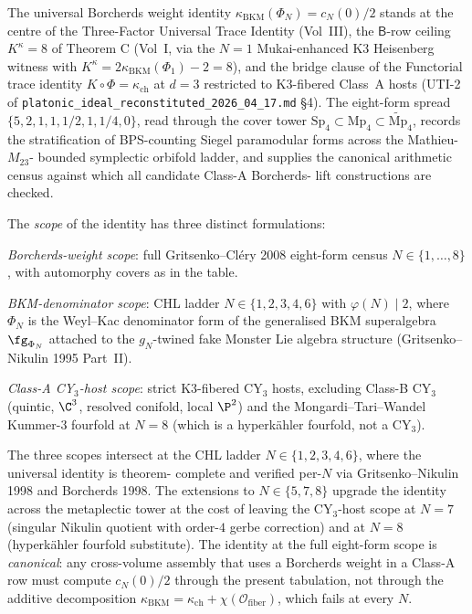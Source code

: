 The universal Borcherds weight identity
$\kappa_{\mathrm{BKM}}(\Phi_N) = c_N(0)/2$ stands at the centre
of the Three-Factor Universal Trace Identity (Vol~III), the
$\mathsf{B}$-row ceiling $K^\kappa = 8$ of Theorem C (Vol~I,
via the $N = 1$ Mukai-enhanced K3 Heisenberg witness with
$K^\kappa = 2 \kappa_{\mathrm{BKM}}(\Phi_1) - 2 = 8$), and the
bridge clause of the Functorial trace identity
$K \circ \Phi = \kappa_{\mathrm{ch}}$ at $d = 3$ restricted to
K3-fibered Class~A hosts (UTI-2 of
\texttt{platonic\_ideal\_reconstituted\_2026\_04\_17.md} \S 4).
The eight-form spread
$\{5, 2, 1, 1, 1/2, 1, 1/4, 0\}$, read through the cover tower
$\mathrm{Sp}_4 \subset \mathrm{Mp}_4 \subset
\widetilde{\mathrm{Mp}}_4$, records the stratification of
BPS-counting Siegel paramodular forms across the Mathieu-$M_{23}$-
bounded symplectic orbifold ladder, and supplies the canonical
arithmetic census against which all candidate Class-A Borcherds-
lift constructions are checked.

The \emph{scope} of the identity has three distinct
formulations:

\emph{Borcherds-weight scope}: full
Gritsenko--Cl\'ery 2008 eight-form census $N \in \{1, \ldots, 8\}$,
with automorphy covers as in the table.

\emph{BKM-denominator scope}: CHL ladder $N \in \{1, 2, 3, 4, 6\}$
with $\varphi(N) \mid 2$, where $\Phi_N$ is the Weyl--Kac
denominator form of the generalised BKM superalgebra
$\fg_{\Phi_N}$ attached to the $g_N$-twined fake Monster Lie
algebra structure (Gritsenko--Nikulin 1995 Part~II).

\emph{Class-A CY$_3$-host scope}: strict K3-fibered
CY$_3$ hosts, excluding Class-B CY$_3$ (quintic, $\C^3$,
resolved conifold, local $\P^2$) and the Mongardi--Tari--Wandel
Kummer-$3$ fourfold at $N = 8$ (which is a hyperk\"ahler
fourfold, not a CY$_3$).

The three scopes intersect at the CHL ladder $N \in
\{1, 2, 3, 4, 6\}$, where the universal identity is theorem-
complete and verified per-$N$ via Gritsenko--Nikulin 1998 and
Borcherds 1998. The extensions to $N \in \{5, 7, 8\}$ upgrade
the identity across the metaplectic tower at the cost of
leaving the CY$_3$-host scope at $N = 7$ (singular Nikulin
quotient with order-$4$ gerbe correction) and at $N = 8$
(hyperk\"ahler fourfold substitute). The identity at the full
eight-form scope is \emph{canonical}: any cross-volume
assembly that uses a Borcherds weight in a Class-A row must
compute $c_N(0)/2$ through the present tabulation, not through
the additive decomposition
$\kappa_{\mathrm{BKM}} = \kappa_{\mathrm{ch}} +
\chi(\mathcal{O}_{\mathrm{fiber}})$, which fails at every $N$.

